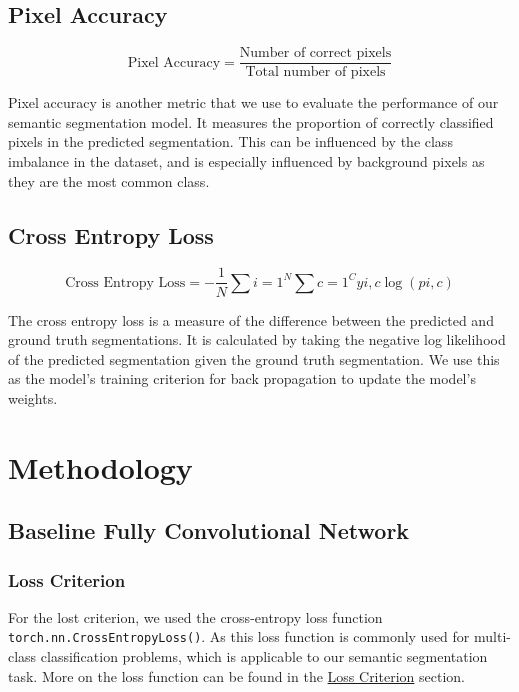 \documentclass{article}
\begin{document}
\subsection{Pixel Accuracy}

\begin{equation}
  \text{Pixel Accuracy} = \frac{\text{Number of correct pixels}}{\text{Total number of pixels}}
\end{equation}

Pixel accuracy is another metric that we use to evaluate the performance of our semantic segmentation model. It measures the proportion of correctly classified pixels in the predicted segmentation.
This can be influenced by the class imbalance in the dataset, and is especially influenced by background pixels as they are the most common class.

\subsection{Cross Entropy Loss}
\label{sec:loss_criterion}
\begin{equation}
  \text{Cross Entropy Loss} = -\frac{1}{N} \sum{i=1}^{N} \sum{c=1}^{C} y{i,c} \log(p{i,c})
\end{equation}

The cross entropy loss is a measure of the difference between the predicted and ground truth segmentations. It is calculated by taking the negative log likelihood of the predicted segmentation given the ground truth segmentation.
We use this as the model's training criterion for back propagation to update the model's weights.

\section{Methodology}

\subsection{Baseline Fully Convolutional Network}
\subsubsection{Loss Criterion}
For the lost criterion, we used the cross-entropy loss function
\texttt{torch.nn.CrossEntropyLoss()}. As this loss function
is commonly used for multi-class classification problems, which is
applicable to our semantic segmentation task. More on the loss function
can be found in the \hyperref[sec:loss_criterion]{Loss Criterion} section.
\end{document}
